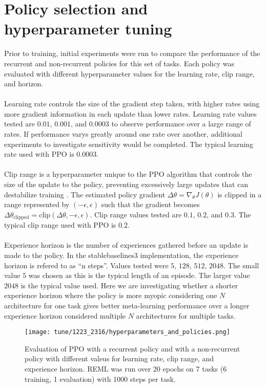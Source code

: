 \section{Policy selection and hyperparameter tuning}
Prior to training, initial experiments were run to compare the performance of the recurrent 
and non-recurrent policies for this set of tasks. Each policy was evaluated with different
hyperparameter values for the learning rate, clip range, and horizon.
\\\\
Learning rate controls the size of the gradient step taken, with higher rates using more 
gradient information in each update than lower rates.
Learning rate values tested are $0.01$, $0.001$, and $0.0003$ to observe performance over a 
large range of rates. If performance varys greatly around one rate over another, additional 
experiments to investigate sensitivity would be completed. The typical learning rate used
with PPO is $0.0003$.
\\\\
Clip range is a hyperparameter unique to the PPO algorithm that controls the size of the update 
to the policy, preventing excessively large updates that can destabilize training \cite{SchuWolDha:17}.
The estimated policy gradient $\Delta \theta = \nabla_{\theta} J(\theta)$ is clipped in a range
represented by $(-\epsilon, \epsilon)$ such that the gradient becomes 
$\Delta \theta_{\text{clipped}} = \text{clip}(\Delta \theta, -\epsilon, \epsilon)$.
Clip range values tested are $0.1$, $0.2$, and $0.3$. The typical clip range used with PPO is
$0.2$.
\\\\
Experience horizon is the number of experiences gathered before an update is made to the policy. 
In the stablebaselines3 implementation, the experience horizon is refered to as ``n steps''. Values 
tested were $5$, $128$, $512$, $2048$. The small value $5$ was chosen as this is the typical length of an 
episode. The larger value $2048$ is the typical value used. Here we are investigating whether 
a shorter experience horizon where the policy is more myopic considering one $N$ architecture for 
one task gives better meta-learning performance over a longer experience horizon considered multiple 
$N$ architectures for multiple tasks.
\begin{figure}[hbt!]  
    \centering
    \texttt{[image: tune/1223\_2316/hyperparameters\_and\_policies.png]}
    \caption{Evaluation of PPO with a recurrent policy and with a non-recurrent policy with 
    different valeus for learning rate, clip range, and experience horizon. REML was run over 20 epochs 
    on 7 tasks (6 training, 1 evaluation) with 1000 steps per task.}
    \label{fig:Hyperparameters-policies} 
\end{figure}
\clearpage

